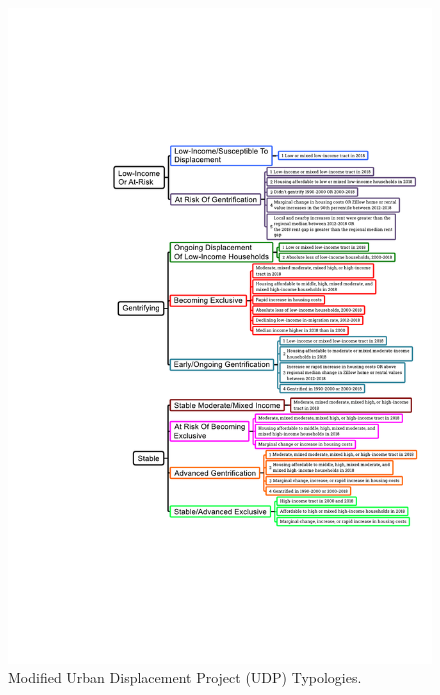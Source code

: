 \documentclass[12pt]{article}
\begin{document}
\begin{figure}[H]
  \centering %
  \includegraphics[width=\linewidth]{images/modified_typologies}
  \captionsetup{justification=centering, singlelinecheck=false, margin=2cm}
  \caption[Modified UDP Displacement Typologies]{Modified Urban Displacement Project (UDP) Typologies.}
  \label{fig:modified_typologies}
\end{figure}
\end{document}
